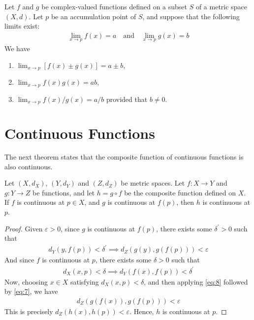\documentclass[thmcnt=section, 12pt]{my-elegantbook}
\begin{document}
\begin{theorem}
    Let $f$ and $g$ be complex-valued functions defined on a subset $S$ of a metric space $(X,d)$. Let $p$ be an accumulation point of $S$, and suppose that the following limits exist:
    \begin{align*}
        \lim_{x \to p} f(x) = a
        \quad \text{and} \quad 
        \lim_{x \to p} g(x) = b
    \end{align*}
    We have
    \begin{enumerate}
        \item $\lim_{x \to p}[f(x) \pm g(x)] = a \pm b$,
        \item $\lim_{x \to p}f(x) g(x) = a b$,
        \item $\lim_{x \to p} f(x) / g(x) = a / b$ provided that $b \neq 0$.
    \end{enumerate}
\end{theorem}


\section{Continuous Functions}


The next theorem states that the composite function of continuous functions is also continuous.

\begin{theorem} \label{thm:3}
    Let $(X, d_X)$, $(Y, d_Y)$ and $(Z, d_Z)$ be metric spaces. Let $f: X \to Y$ and $g: Y \to Z$ be functions, and let $h = g \circ f$ be the composite function defined on $X$. If $f$ is continuous at $p \in X$, and $g$ is continuous at $f(p)$, then $h$ is continuous at $p$.
\end{theorem}

\begin{proof}
    Given $\varepsilon > 0$, since $g$ is continuous at $f(p)$, there exists some $\delta^\prime > 0$ such that
    \begin{align}
        d_Y(y, f(p)) < \delta^\prime
        \implies d_Z(g(y), g(f(p))) < \varepsilon
        \label{eq:7}
    \end{align}
    And since $f$ is continuous at $p$, there exists some $\delta > 0$ such that 
    \begin{align}
        d_X(x, p) < \delta
        \implies d_Y(f(x), f(p)) < \delta^\prime
        \label{eq:8}
    \end{align}
    Now, choosing $x \in X$ satisfying $d_X(x, p) < \delta$, and then applying \eqref{eq:8} followed by \eqref{eq:7}, we have
    \begin{align*}
        d_Z(g(f(x)), g(f(p))) < \varepsilon
    \end{align*} 
    This is precisely $d_Z(h(x), h(p)) < \varepsilon$. Hence, $h$ is continuous at $p$.
\end{proof}
\end{document}
